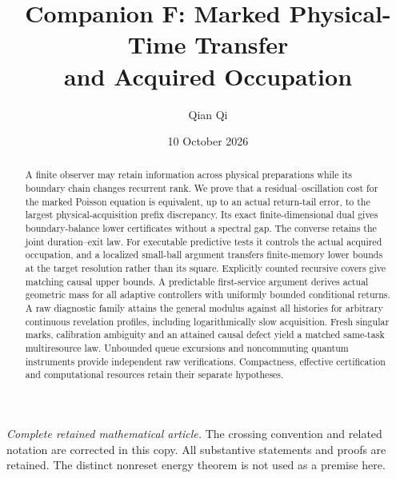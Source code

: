 \documentclass[11pt]{amsart}
\title[Marked physical-time transfer]{Companion F: Marked Physical-Time Transfer\\and Acquired Occupation}
\author{Qian Qi}
\date{10 October 2026}
\theoremstyle{definition}\newtheorem{definition}[theorem]{Definition}
\theoremstyle{remark}\newtheorem{remark}[theorem]{Remark}
\begin{document}
\begin{abstract}
A finite observer may retain information across physical preparations while its boundary chain changes recurrent rank. We prove that a residual--oscillation cost for the marked Poisson equation is equivalent, up to an actual return-tail error, to the largest physical-acquisition prefix discrepancy. Its exact finite-dimensional dual gives boundary-balance lower certificates without a spectral gap. The converse retains the joint duration--exit law. For executable predictive tests it controls the actual acquired occupation, and a localized small-ball argument transfers finite-memory lower bounds at the target resolution rather than its square. Explicitly counted recursive covers give matching causal upper bounds. A predictable first-service argument derives actual geometric mass for all adaptive controllers with uniformly bounded conditional returns. A raw diagnostic family attains the general modulus against all histories for arbitrary continuous revelation profiles, including logarithmically slow acquisition. Fresh singular marks, calibration ambiguity and an attained causal defect yield a matched same-task multiresource law. Unbounded queue excursions and noncommuting quantum instruments provide independent raw verifications. Compactness, effective certification and computational resources retain their separate hypotheses.
\end{abstract}
\maketitle
\noindent\emph{Complete retained mathematical article.} The crossing convention and related notation are corrected in this copy. All substantive statements and proofs are retained. The distinct nonreset energy theorem is not used as a premise here.














\end{document}
